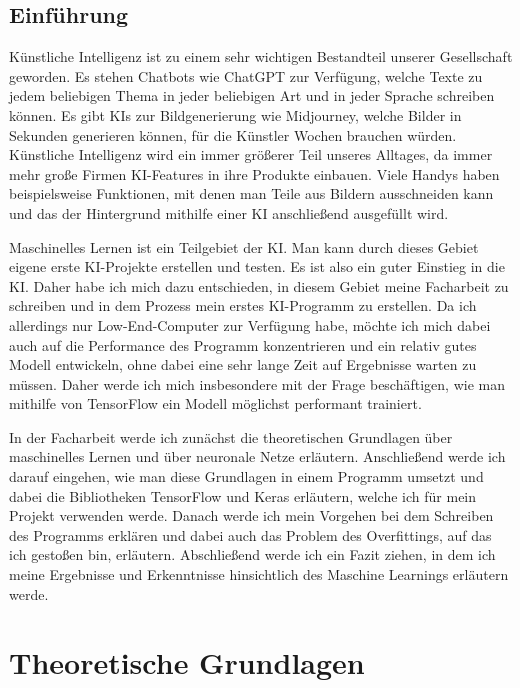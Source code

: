 \documentclass[11pt,oneside]{report}
\begin{document}


\setcounter{page}{2}
\tableofcontents

\listoffigures

\newpage


\section{Einführung}
Künstliche Intelligenz ist zu einem sehr wichtigen Bestandteil unserer Gesellschaft geworden. Es stehen Chatbots wie ChatGPT zur Verfügung, welche Texte zu jedem beliebigen Thema in jeder beliebigen Art und in jeder Sprache schreiben können. Es gibt KIs zur Bildgenerierung wie Midjourney, welche Bilder in Sekunden generieren können, für die Künstler Wochen brauchen würden. Künstliche Intelligenz wird ein immer größerer Teil unseres Alltages, da immer mehr große Firmen KI-Features in ihre Produkte einbauen. Viele Handys haben beispielsweise Funktionen, mit denen man Teile aus Bildern ausschneiden kann und das der Hintergrund mithilfe einer KI anschließend ausgefüllt wird.

Maschinelles Lernen ist ein Teilgebiet der KI. Man kann durch dieses Gebiet eigene erste KI-Projekte erstellen und testen. Es ist also ein guter Einstieg in die KI. Daher habe ich mich dazu entschieden, in diesem Gebiet meine Facharbeit zu schreiben und in dem Prozess mein erstes KI-Programm zu erstellen. Da ich allerdings nur Low-End-Computer zur Verfügung habe, möchte ich mich dabei auch auf die Performance des Programm konzentrieren und ein relativ gutes Modell entwickeln, ohne dabei eine sehr lange Zeit auf Ergebnisse warten zu müssen. Daher werde ich mich insbesondere mit der Frage beschäftigen, wie man mithilfe von TensorFlow ein Modell möglichst performant trainiert.

In der Facharbeit werde ich zunächst die theoretischen Grundlagen über maschinelles Lernen und über neuronale Netze erläutern. Anschließend werde ich darauf eingehen, wie man diese Grundlagen in einem Programm umsetzt und dabei die Bibliotheken TensorFlow und Keras erläutern, welche ich für mein Projekt verwenden werde. Danach werde ich mein Vorgehen bei dem Schreiben des Programms erklären und dabei auch das Problem des Overfittings, auf das ich gestoßen bin, erläutern. Abschließend werde ich ein Fazit ziehen, in dem ich meine Ergebnisse und Erkenntnisse hinsichtlich des Maschine Learnings erläutern werde.


\chapter{Theoretische Grundlagen}
\end{document}
